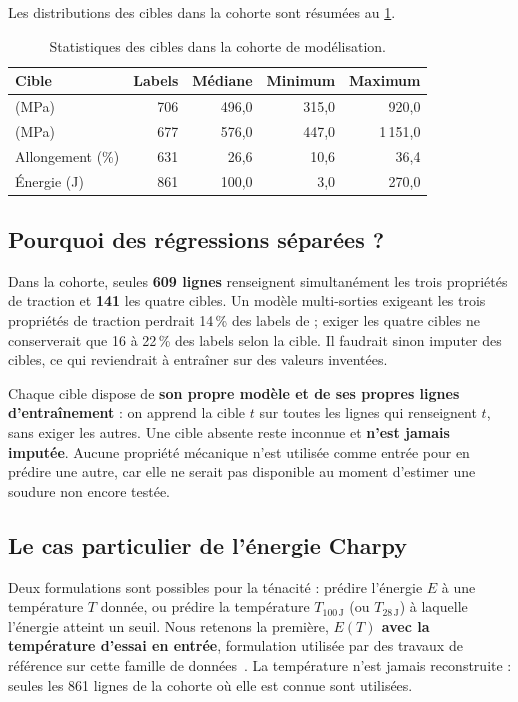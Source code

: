 Les distributions des cibles dans la cohorte sont résumées au \cref{tab:stats_cibles}.

\begin{table}[htbp]
\centering
\small
\caption{Statistiques des cibles dans la cohorte de modélisation.}
\label{tab:stats_cibles}
\begin{tabular}{@{}lrrrr@{}}
\toprule
Cible & Labels & Médiane & Minimum & Maximum \\
\midrule
\YS{} (MPa)              & 706 & 496,0 & 315,0 & 920,0 \\
\UTS{} (MPa)             & 677 & 576,0 & 447,0 & 1\,151,0 \\
Allongement (\%)         & 631 & 26,6  & 10,6  & 36,4 \\
Énergie \charpy{} (J)    & 861 & 100,0 & 3,0   & 270,0 \\
\bottomrule
\end{tabular}
\end{table}

\subsection{Pourquoi des régressions séparées ?}

Dans la cohorte, seules \textbf{609 lignes} renseignent simultanément les trois
propriétés de traction et \textbf{141} les quatre cibles. Un modèle
multi-sorties exigeant les trois propriétés de traction perdrait 14\,\% des
labels de \YS ; exiger les quatre cibles ne conserverait que 16 à 22\,\% des
labels selon la cible. Il faudrait sinon imputer des cibles, ce qui reviendrait
à entraîner sur des valeurs inventées.

\begin{decision}
Chaque cible dispose de \textbf{son propre modèle et de ses propres lignes
d'entraînement} : on apprend la cible $t$ sur toutes les lignes qui renseignent
$t$, sans exiger les autres. Une cible absente reste inconnue et
\textbf{n'est jamais imputée}. Aucune propriété mécanique n'est utilisée comme
entrée pour en prédire une autre, car elle ne serait pas disponible au moment
d'estimer une soudure non encore testée.
\end{decision}

\subsection{Le cas particulier de l'énergie Charpy}
\label{subsec:charpy_strategie}

Deux formulations sont possibles pour la ténacité : prédire l'énergie $E$ à une
température $T$ donnée, ou prédire la température $T_{100\,\mathrm{J}}$ (ou
$T_{28\,\mathrm{J}}$) à laquelle l'énergie atteint un seuil. Nous retenons la
première, \textbf{$E(T)$ avec la température d'essai en entrée}, formulation
utilisée par des travaux de référence sur cette famille de données~\cite{bhadeshia_1995,cool_1996}.
La température n'est jamais reconstruite : seules les 861 lignes de la cohorte
où elle est connue sont utilisées.


